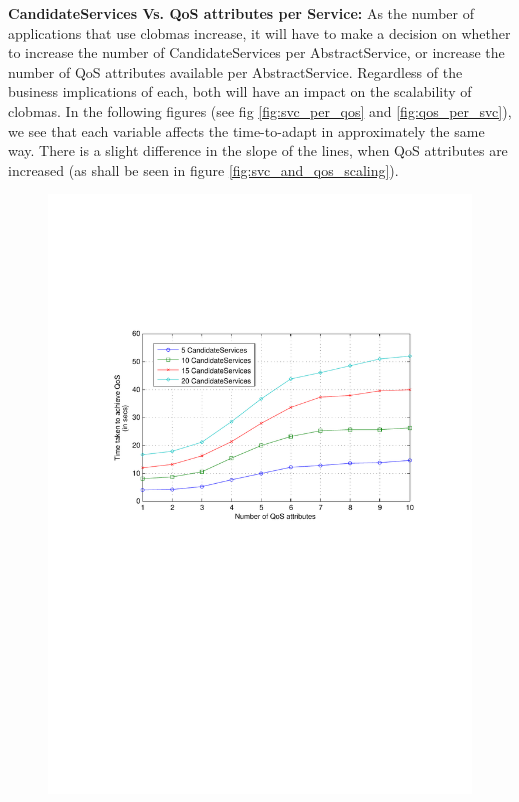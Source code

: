 \documentclass[10pt,journal,compsoc]{IEEEtran}
\begin{document}
\textbf{CandidateServices Vs. QoS attributes per Service:}
As the number of applications that use clobmas increase, it will have to make a decision on whether to increase the number of CandidateServices per AbstractService, or increase the number of QoS attributes available per AbstractService. Regardless of the business implications of each, both will have an impact on the scalability of clobmas. In the following figures (see fig \ref{fig:svc_per_qos} and \ref{fig:qos_per_svc}), we see that each variable affects the time-to-adapt in approximately the same way. There is a slight difference in the slope of the lines, when QoS attributes are increased (as shall be seen in figure \ref{fig:svc_and_qos_scaling}).

\begin{figure}[htbp]
	\begin{minipage}[b]{0.4\linewidth}
		\includegraphics[clip, trim=4cm 14cm 2cm 6cm, scale=0.3]{graphs/5_10_15_20_svc_per_qos_scaling.pdf}

\end{minipage}
\end{figure}
\end{document}
